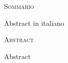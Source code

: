 \begin{center}
  \textsc{Sommario}
\end{center}
%
\noindent
%
\begin{otherlanguage}{italian}
  Abstract in italiano
\end{otherlanguage}

\newpage


\begin{center}
  \textsc{Abstract}
\end{center}
%
\noindent
%
Abstract

\newpage
\
\thispagestyle{empty}
\cleardoublepage
